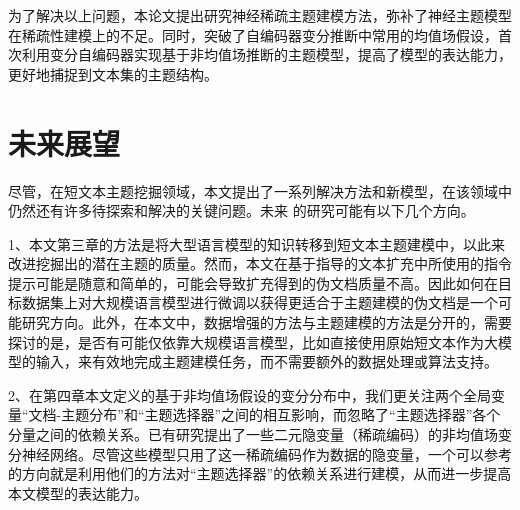 为了解决以上问题，本论文提出研究神经稀疏主题建模方法，弥补了神经主题模型在稀疏性建模上的不足。同时，突破了自编码器变分推断中常用的均值场假设，首次利用变分自编码器实现基于非均值场推断的主题模型，提高了模型的表达能力，更好地捕捉到文本集的主题结构。

\section{未来展望}
尽管，在短文本主题挖掘领域，本文提出了一系列解决方法和新模型，在该领域中仍然还有许多待探索和解决的关键问题。未来 的研究可能有以下几个方向。

1、本文第三章的方法是将大型语言模型的知识转移到短文本主题建模中，以此来改进挖掘出的潜在主题的质量。然而，本文在基于指导的文本扩充中所使用的指令提示可能是随意和简单的，可能会导致扩充得到的伪文档质量不高。因此如何在目标数据集上对大规模语言模型进行微调以获得更适合于主题建模的伪文档是一个可能研究方向。此外，在本文中，数据增强的方法与主题建模的方法是分开的，需要探讨的是，是否有可能仅依靠大规模语言模型，比如直接使用原始短文本作为大模型的输入，来有效地完成主题建模任务，而不需要额外的数据处理或算法支持。

2、在第四章本文定义的基于非均值场假设的变分分布中，我们更关注两个全局变量“文档-主题分布”和“主题选择器”之间的相互影响，而忽略了“主题选择器”各个分量之间的依赖关系。已有研究提出了一些二元隐变量（稀疏编码）的非均值场变分神经网络。尽管这些模型只用了这一稀疏编码作为数据的隐变量，一个可以参考的方向就是利用他们的方法对“主题选择器”的依赖关系进行建模，从而进一步提高本文模型的表达能力。